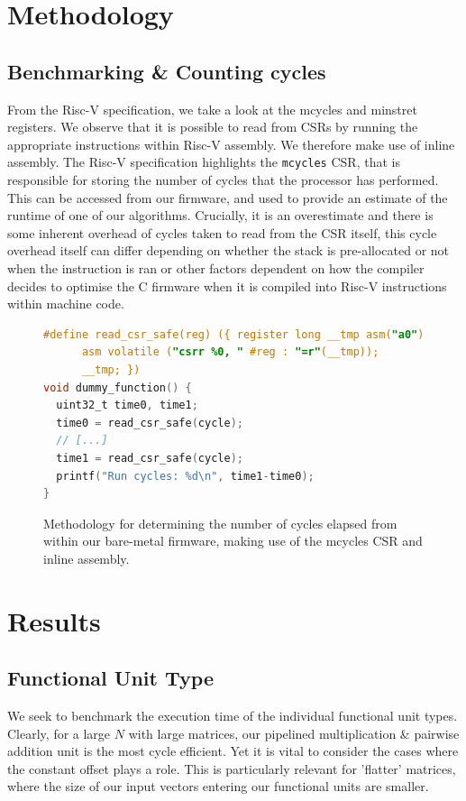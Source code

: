 \documentclass[a4paper,8pt]{report}
\begin{document}
\section{Methodology}
\subsection{Benchmarking \& Counting cycles}
From the Risc-V specification, we take a look at the mcycles and minstret
registers. We observe that it is possible to read from CSRs by running the
appropriate instructions within Risc-V assembly. We therefore make use of inline
assembly. The Risc-V specification highlights the \texttt{mcycles} CSR, that is
responsible for storing the number of cycles that the processor has performed.
This can be accessed from our firmware, and used to provide an estimate of the
runtime of one of our algorithms. Crucially, it is an overestimate and there is
some inherent overhead of cycles taken to read from the CSR itself, this
cycle overhead itself can differ depending on whether the stack is pre-allocated
or not when the instruction is ran or other factors dependent on how the
compiler decides to optimise the C firmware when it is compiled into Risc-V
instructions within machine code.

\begin{figure}[h]
\begin{lstlisting}[language=C,style=customc]
#define read_csr_safe(reg) ({ register long __tmp asm("a0");  \
      asm volatile ("csrr %0, " #reg : "=r"(__tmp));          \
      __tmp; })
void dummy_function() {
  uint32_t time0, time1;
  time0 = read_csr_safe(cycle);
  // [...]
  time1 = read_csr_safe(cycle);
  printf("Run cycles: %d\n", time1-time0);
}
\end{lstlisting}
  \caption{Methodology for determining the number of cycles elapsed from within
    our bare-metal firmware, making use of the mcycles CSR and inline assembly.}
\end{figure}

\section{Results}
\subsection{Functional Unit Type}
We seek to benchmark the execution time of the individual functional unit types.
Clearly, for a large $N$ with large matrices, our pipelined multiplication \&
pairwise addition unit is the most cycle efficient. Yet it is vital to consider
the cases where the constant offset plays a role. This is particularly relevant
for 'flatter' matrices, where the size of our input vectors entering our
functional units are smaller.
\end{document}
